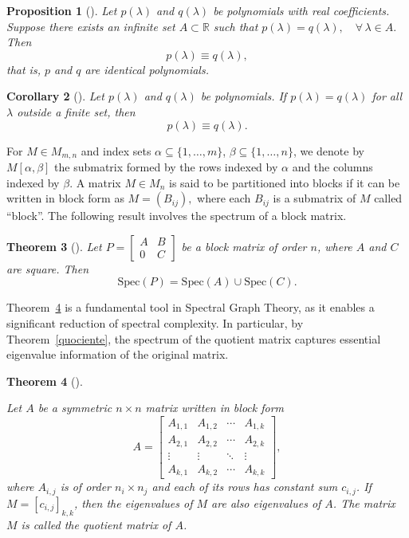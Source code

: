 \documentclass{article}
\newtheorem{theorem}{Theorem}[section]
\newtheorem{corollary}[theorem]{Corollary}
\newtheorem{proposition}[theorem]{Proposition}
\begin{document}
\begin{proposition}[\cite{lang2002algebra, dummit2004abstract}]\label{prop:identidadepolinomial}
Let $p(\lambda)$ and $q(\lambda)$ be polynomials with real coefficients. Suppose there exists an infinite set $A \subset \mathbb{R}$ such that $p(\lambda)=q(\lambda), \quad \forall\, \lambda \in A.$ Then
\[
p(\lambda)\equiv q(\lambda),
\]
that is, $p$ and $q$ are identical polynomials.
\end{proposition}

\begin{corollary}[\cite{lang2002algebra, dummit2004abstract}]\label{cor:fora_do_finito}
Let $p(\lambda)$ and $q(\lambda)$ be polynomials. If $p(\lambda)=q(\lambda)$ for all $\lambda$ outside a finite set, then
\[
p(\lambda)\equiv q(\lambda).
\]
\end{corollary}

For \( M \in M_{m,n} \) and index sets \( \alpha \subseteq \{1,\ldots,m\} \), \( \beta \subseteq \{1,\ldots,n\} \), we denote by \( M[\alpha,\beta] \) the submatrix formed by the rows indexed by \( \alpha \) and the columns indexed by \( \beta \). A matrix \( M \in M_n \) is said to be partitioned into blocks if it can be written in block form as $M = (B_{ij}),$
where each \( B_{ij} \) is a submatrix of \( M \) called ``block''. The following result involves the spectrum of a block matrix.

\begin{theorem}[\cite{horn_johnson_2013}] \label{theo:union}
Let \( P = \begin{bmatrix} A & B \\ 0 & C \end{bmatrix} \) be a block matrix of order \( n \), where \( A \) and \( C \) are square. Then
\[
\mathrm{Spec}(P) = \mathrm{Spec}(A) \cup \mathrm{Spec}(C).
\]
\end{theorem}

Theorem~\ref{equitable} is a fundamental tool in Spectral Graph Theory, as it enables a significant reduction of spectral complexity. In particular, by Theorem~\ref{quociente}, the spectrum of the quotient matrix captures essential eigenvalue information of the original matrix.

\begin{theorem}[\cite{horn_johnson_2013}]\label{equitable}

Let \( A \) be a symmetric $n\times n$ matrix written in block form
\[
A = 
\begin{bmatrix}
A_{1,1} & A_{1,2} & \cdots & A_{1,k} \\
A_{2,1} & A_{2,2} & \cdots & A_{2,k} \\
\vdots & \vdots & \ddots & \vdots \\
A_{k,1} & A_{k,2} & \cdots & A_{k,k}
\end{bmatrix},
\]
where \( A_{i,j} \) is of order \( n_i \times n_j \) and each of its rows has constant sum \( c_{i,j} \). If \(M = [c_{i,j}]_{k,k}\), then the eigenvalues of \( M \) are also eigenvalues of \( A \). The matrix $M$ is called the quotient matrix of $A$.
\end{theorem}
\end{document}
